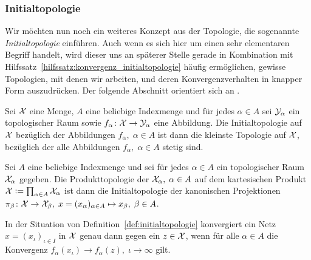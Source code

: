 \documentclass[../main/main.tex]{subfiles}
\begin{document}
	\subsubsection*{Initialtopologie}
	
	Wir möchten nun noch ein weiteres Konzept aus der Topologie, die sogenannte \emph{Initialtopologie} einführen.
	Auch wenn es sich hier um einen sehr elementaren Begriff handelt, wird dieser uns an späterer Stelle gerade 
	in Kombination mit Hilfssatz~\ref{hilfssatz:konvergenz_initialtopologie} häufig ermöglichen, 
	gewisse Topologien, mit denen wir arbeiten, und deren Konvergenzverhalten in knapper Form auszudrücken. 
	Der folgende Abschnitt orientiert sich an \cite[Kapitel 2.13]{Aliprantis.2006}.
	
	\begin{Definition}[Initialtopologie]
		\label{def:initialtopologie}
		Sei $\mathcal{X}$ eine Menge, $A$ eine beliebige Indexmenge und für jedes $\alpha \in A$ sei $\mathcal{Y}_\alpha$ ein topologischer Raum sowie $f_\alpha \colon \mathcal{X} \to \mathcal{Y}_\alpha$ eine Abbildung.
		Die Initialtopologie auf $\mathcal{X}$ bezüglich der Abbildungen $f_\alpha, \; \alpha \in A$ ist dann die kleinste Topologie auf $\mathcal{X}$, bezüglich der alle Abbildungen 
		$f_\alpha, \; \alpha \in A$ stetig sind.
	\end{Definition}

	\begin{Bemerkung}[Produkttopologie]
		Sei $A$ eine beliebige Indexmenge und sei für jedes $\alpha \in A$ ein topologischer Raum $\mathcal{X}_\alpha$ gegeben. Die Produkttopologie der $\mathcal{X}_\alpha, \; \alpha \in A$
		auf dem kartesischen Produkt $\mathcal{X} \vcentcolon = \prod_{\alpha \in A} \mathcal{X}_\alpha$ ist dann die Initialtopologie der kanonischen Projektionen 
		$\pi_\beta \colon \mathcal{X} \to \mathcal{X}_\beta, \; x = (x_\alpha)_{\alpha \in A} \mapsto x_\beta , \; \beta \in A$.
	\end{Bemerkung}
	
	\begin{Hilfssatz}
		\label{hilfssatz:konvergenz_initialtopologie}
		In der Situation von Definition~\ref{def:initialtopologie} konvergiert ein Netz $x = (x_\iota)_{\iota \in I}$ in $\mathcal{X}$ genau dann gegen ein $z \in \mathcal{X}$, wenn für alle $\alpha \in A$
		die Konvergenz $f_\alpha(x_\iota) \to f_\alpha(z), \; \iota \to \infty$ gilt.
	\end{Hilfssatz}
\end{document}
